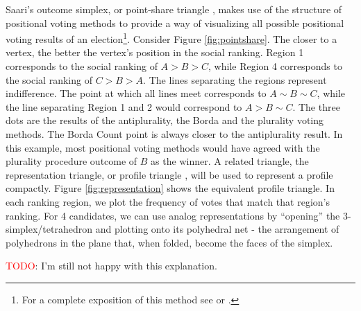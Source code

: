 \documentclass[hidelinks,11pt]{article} \usepackage[utf8]{inputenc}
\begin{document}

Saari's outcome simplex, or point-share triangle
\parencite{eggers20_diagr_analy_ordin_votin_system}, makes use of the structure
of positional voting methods to provide a way of visualizing all possible
positional voting results of an election\footnote{For a complete exposition of
  this method see \textcite{saari1995basic} or \textcite{nurmi2002voting}.}.
Consider Figure \ref{fig:pointshare}. The closer to a vertex, the better the
vertex's position in the social ranking. Region 1 corresponds to the social
ranking of \(A > B > C\), while Region 4 corresponds to the social ranking of
\(C>B>A\). The lines separating the regions represent indifference. The point at
which all lines meet corresponds to \(A \sim B \sim C\), while the line
separating Region 1 and 2 would correspond to \(A > B \sim C\). The three dots
are the results of the antiplurality, the Borda and the plurality voting
methods. The Borda Count point is always closer to the antiplurality result. In
this example, most positional voting methods would have agreed with the
plurality procedure outcome of \(B\) as the winner. A related triangle, the
representation triangle, or profile triangle
\parencite{eggers20_diagr_analy_ordin_votin_system}, will be used to represent a
profile compactly. Figure \ref{fig:representation} shows the equivalent profile
triangle. In each ranking region, we plot the frequency of votes that match that
region's ranking. For 4 candidates, we can use analog representations by
``opening'' the 3-simplex/tetrahedron and plotting onto its polyhedral net - the
arrangement of polyhedrons in the plane that, when folded, become the faces of
the simplex.

\textcolor{red}{TODO}: I'm still not happy with this explanation.
\end{document}

